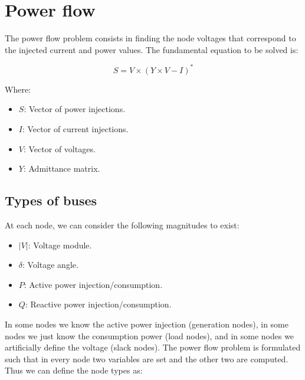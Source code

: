 \documentclass[a4paper,twoside]{tufte-book}
\begin{document}
\chapter{Power flow}

The power flow problem consists in finding the node voltages that correspond to the injected current and power values. The fundamental equation to be solved is:

\begin{equation}
S = V \times (Y \times V - I)^*
\label{eq:power_flow}
\end{equation}


Where:

\begin{itemize}
\item $S$: Vector of power injections.
\item $I$: Vector of current injections.
\item $V$: Vector of voltages.
\item $Y$: Admittance matrix.
\end{itemize}


\section{Types of buses}

At each node, we can consider the following magnitudes to exist:
\begin{itemize}
	\item $|V|$: Voltage module.
	\item $\delta$: Voltage angle.
	\item $P$: Active power injection/consumption.
	\item $Q$: Reactive power injection/consumption.
\end{itemize}

In some nodes we know the active power injection (generation nodes), in some nodes we just know the consumption power (load nodes), and in some nodes we artificially define the voltage (slack nodes). The power flow problem is formulated such that in every node two variables are set and the other two are computed. Thus we can define the node types as:
\end{document}
